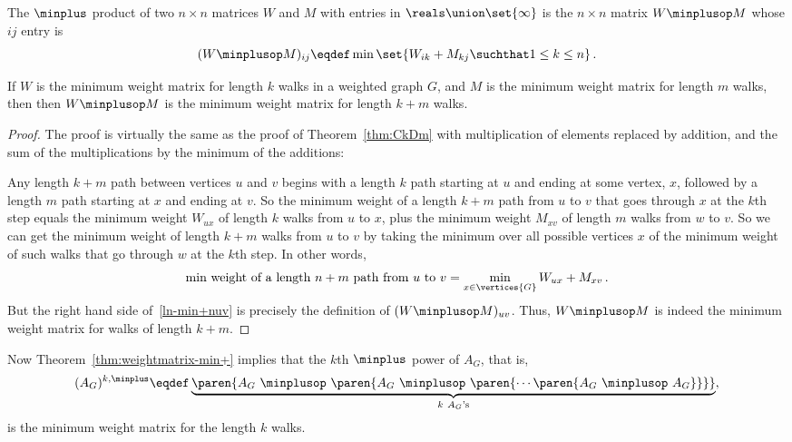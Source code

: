 \begin{editingnotes}
\begin{definition}\label{def:minplus}
  The $\minplus$ product of two $n\times n$ matrices $W$ and $M$ with
  entries in $\reals\union \set{\infty}$ is the $n \times n$ matrix
  $W\minplusop M$ whose $ij$ entry is
\[
(W\minplusop M )_{ij} \eqdef \min \set{W_{ik} + M_{kj} \suchthat 1 \leq k \leq n}\, .
\]
\end{definition}

\begin{theorem}\label{thm:weightmatrix-min+}
  If $W$ is the minimum weight matrix for length $k$ walks in a weighted
  graph $G$, and $M$ is the minimum weight matrix for length $m$ walks,
  then then $W\minplusop M$ is the minimum weight matrix for length $k+m$
  walks.
\end{theorem}

\begin{proof}
  The proof is virtually the same as the proof of Theorem~\ref{thm:CkDm}
  with multiplication of elements replaced by addition, and the sum of the
  multiplications by the minimum of the additions:

  Any length $k+m$ path between vertices $u$ and $v$ begins with a length
  $k$ path starting at $u$ and ending at some vertex, $x$, followed by a
  length $m$ path starting at $x$ and ending at $v$.  So the minimum
  weight of a length $k+m$ path from $u$ to $v$ that goes through $x$ at
  the $k$th step equals the minimum weight $W_{ux}$ of length $k$ walks
  from $u$ to $x$, plus the minimum weight $M_{xv}$ of length $m$ walks
  from $w$ to $v$.  So we can get the minimum weight of length $k+m$ walks
  from $u$ to $v$ by taking the minimum over all possible vertices $x$ of
  the minimum weight of such walks that go through $w$ at the $k$th step.
  In other words,
\begin{equation}\label{ln-min+nuv}
\text{min weight of a length $n+m$ path from $u$ to $v$} =
              \min_{x \in \vertices{G}} W_{ux}+M_{xv}\, .
\end{equation}
But the right hand side of~\eqref{ln-min+nuv} is precisely the definition of
$(W\minplusop M)_{uv}$.  Thus, $W\minplusop M$ is indeed the minimum weight
matrix for walks of length $k+m$.
\end{proof}

Now Theorem~\ref{thm:weightmatrix-min+} implies that the $k$th $\minplus$ power
of $A_G$, that is,
\[
(A_G)^{k, \minplus} \eqdef \underbrace{\paren{A_G\ \minplusop\ \paren{A_G\
      \minplusop\ \paren{\cdots \paren{A_G\ \minplusop\ A_G}} }}}_{k\ A_G\text{'s}},
\]
is the minimum weight matrix for the length $k$ walks.


\end{editingnotes}
